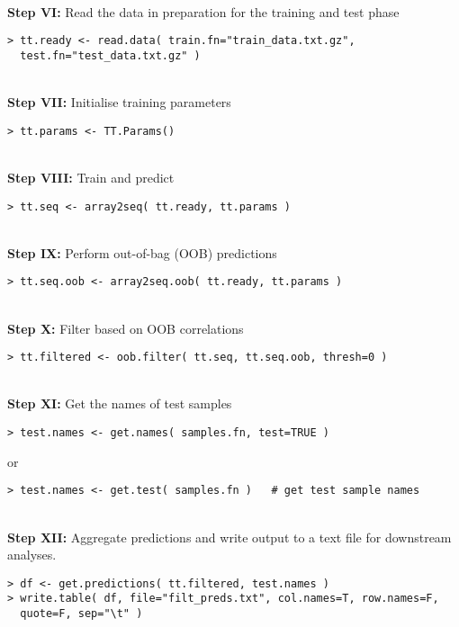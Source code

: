 \documentclass[a4paper,12pt]{article}
\begin{document}
\noindent\\
\textbf{Step VI:} Read the data in preparation for the training and test phase
\begin{verbatim}
> tt.ready <- read.data( train.fn="train_data.txt.gz", 
  test.fn="test_data.txt.gz" )
\end{verbatim}

\noindent\\
\textbf{Step VII:} Initialise training parameters
\begin{verbatim}
> tt.params <- TT.Params()
\end{verbatim}

\noindent\\
\textbf{Step VIII:} Train and predict
\begin{verbatim}
> tt.seq <- array2seq( tt.ready, tt.params )
\end{verbatim}

\noindent\\
\textbf{Step IX:} Perform out-of-bag (OOB) predictions
\begin{verbatim}
> tt.seq.oob <- array2seq.oob( tt.ready, tt.params )
\end{verbatim}

\noindent\\
\textbf{Step X:} Filter based on OOB correlations
\begin{verbatim}
> tt.filtered <- oob.filter( tt.seq, tt.seq.oob, thresh=0 )
\end{verbatim}

\noindent\\
\textbf{Step XI:} Get the names of test samples
\begin{verbatim}
> test.names <- get.names( samples.fn, test=TRUE )
\end{verbatim}
or 
\begin{verbatim}
> test.names <- get.test( samples.fn )   # get test sample names
\end{verbatim}

\noindent\\
\textbf{Step XII:} Aggregate predictions and write output to a text file for downstream analyses.
\begin{verbatim}
> df <- get.predictions( tt.filtered, test.names )
> write.table( df, file="filt_preds.txt", col.names=T, row.names=F, 
  quote=F, sep="\t" )
\end{verbatim}
\end{document}
